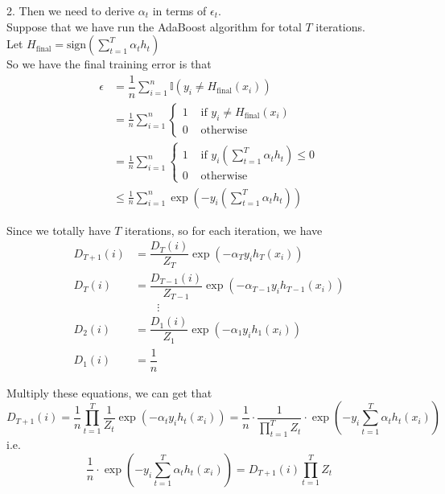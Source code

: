 2. Then we need to derive $\alpha_t$ in terms of $\epsilon_t$. \\
Suppose that we have run the AdaBoost algorithm for total $T$ iterations. \\
Let $H_{\text{final}}=\text{sign}\left(\sum\limits_{t=1}^T\alpha_th_t\right)$ \\
So we have the final training error is that
\begin{align*}
\epsilon &=\dfrac{1}{n}\sum_{i=1}^n\mathbb{I}(y_i\neq H_{\text{final}}(x_i))\\
& =\frac{1}{n} \sum_{i=1}^n \begin{cases}1 & \text { if } y_i \neq H_{\text{final}}\left(x_i\right) \\
0 & \text { otherwise }\end{cases} \\
& =\frac{1}{n} \sum_{i=1}^n \begin{cases}1 & \text { if } y_i \left(\sum\limits_{t=1}^T\alpha_th_t\right) \leq 0 \\
0 & \text { otherwise }\end{cases} \\
& \leq \frac{1}{n} \sum_{i=1}^n \exp \left(-y_i \left(\sum\limits_{t=1}^T\alpha_th_t\right)\right)
\end{align*}

Since we totally have $T$ iterations, so for each iteration, we have
\begin{align*}
D_{T+1}(i) &= \dfrac{D_{T}(i)}{Z_T}\exp(-\alpha_{T}y_ih_{T}(x_i)) \\
D_{T}(i) &= \dfrac{D_{T-1}(i)}{Z_{T-1}}\exp(-\alpha_{T-1}y_ih_{T-1}(x_i)) \\
&\quad\quad\vdots \\
D_2(i) &= \dfrac{D_1(i)}{Z_1}\exp(-\alpha_1y_ih_1(x_i)) \\
D_1(i) &= \dfrac{1}{n}
\end{align*}

Multiply these equations, we can get that
$$D_{T+1}(i)=\dfrac{1}{n}\prod_{t=1}^{T}\dfrac{1}{Z_t}\exp(-\alpha_ty_ih_t(x_i)) = \dfrac{1}{n}\cdot \dfrac{1}{\prod\limits_{t=1}^{T}Z_t}\cdot \exp\left(-y_i\sum_{t=1}^{T}\alpha_th_t(x_i)\right)$$
i.e.
$$\dfrac{1}{n}\cdot \exp\left(-y_i\sum_{t=1}^{T}\alpha_th_t(x_i)\right)=D_{T+1}(i)\prod_{t=1}^{T}Z_t$$

